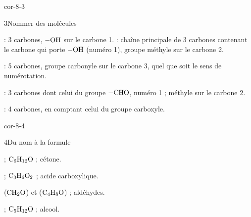 \begin{blocLivre}{cor-8-3}
\begin{corrige}{3}{Nommer des molécules}
\begin{questions}
\item {} : 3 carbones, $\ce{-OH}$ sur le carbone 1.  : chaîne principale de 3 carbones
contenant le carbone qui porte $\ce{-OH}$ (numéro 1), groupe méthyle sur le carbone 2.
\item {} : 5 carbones, groupe carbonyle sur le carbone 3, quel que soit le sens de numérotation.
\item {} : 3 carbones dont celui du groupe $\ce{-CHO}$, numéro 1 ; méthyle sur le carbone 2.
\item {} : 4 carbones, en comptant celui du groupe carboxyle.
\end{questions}
\end{corrige}
\end{blocLivre}
\begin{blocLivre}{cor-8-4}
\begin{corrige}{4}{Du nom à la formule}
\begin{questions}
\item {} ; $\ce{C6H12O}$ ; cétone.
\item {} ; $\ce{C3H6O2}$ ; acide carboxylique.
\item {} ($\ce{CH2O}$) et  ($\ce{C4H8O}$) ; aldéhydes.
\item {} ; $\ce{C5H12O}$ ; alcool.
\end{questions}
\end{corrige}
\end{blocLivre}
